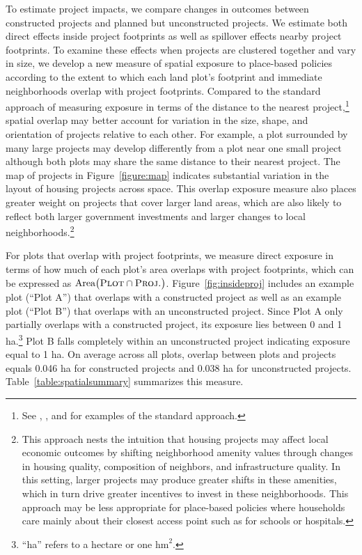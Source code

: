 \documentclass[12pt]{article}
\newcommand{\haref}{
	``ha'' refers to a hectare or one $\text{hm}^{2}$.
}
\begin{document}
To estimate project impacts, we compare changes in outcomes between constructed projects and planned but unconstructed projects.  We estimate both direct effects inside project footprints as well as spillover effects nearby project footprints.  To examine these effects when projects are clustered together and vary in size, we develop a new measure of spatial exposure to place-based policies according to the extent to which each land plot's footprint and immediate neighborhoods overlap with project footprints.  Compared to the standard approach of measuring exposure in terms of the distance to the nearest project,\footnote{See \cite{diamond2019wants}, \cite{rossi2010housing}, and \cite{neumark2015place} for examples of the standard approach.} spatial overlap may better account for variation in the size, shape, and orientation of projects relative to each other.  For example, a plot surrounded by many large projects may develop differently from a plot near one small project although both plots may share the same distance to their nearest project.  The map of projects in Figure~\ref{figure:map} indicates substantial variation in the layout of housing projects across space.  This overlap exposure measure also places greater weight on projects that cover larger land areas, which are also likely to reflect both larger government investments and larger changes to local neighborhoods.\footnote{This approach nests the intuition that housing projects may affect local economic outcomes by shifting neighborhood amenity values through changes in housing quality, composition of neighbors, and infrastructure quality.  In this setting, larger projects may produce greater shifts in these amenities, which in turn drive greater incentives to invest in these neighborhoods.  This approach may be less appropriate for place-based policies where households care mainly about their closest access point such as for schools or hospitals.}

For plots that overlap with project footprints, we measure direct exposure in terms of how much of each plot's area overlaps with project footprints, which can be expressed as $\text{Area}\big(\textsc{Plot}  \cap  \textsc{Proj.}\big)$.  Figure~\ref{fig:insideproj} includes an example plot (``Plot A'') that overlaps with a constructed project as well as an example plot (``Plot B'') that overlaps with an unconstructed project.  Since Plot A only partially overlaps with a constructed project, its exposure lies between 0 and 1 ha.\footnote{\haref}  Plot B falls completely within an unconstructed project indicating exposure equal to 1 ha.  On average across all plots, overlap between plots and projects equals 0.046 ha for constructed projects and 0.038 ha for unconstructed projects. Table~\ref{table:spatialsummary} summarizes this measure.
\end{document}
